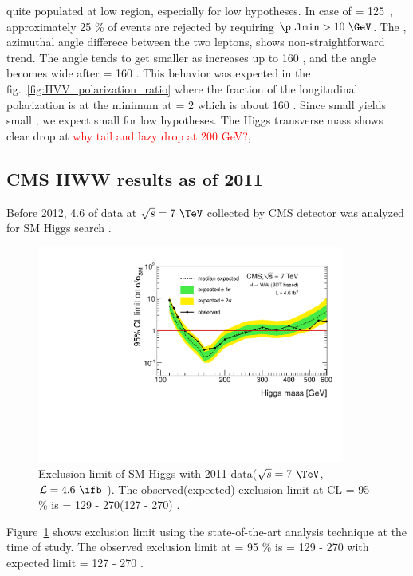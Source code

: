 quite populated at low \ptlmin{} region, especially for low \mHi{} 
hypotheses. In case of \mHi = 125~\GeV, approximately 25 \% of 
events are rejected by requiring $\ptlmin>10~\GeV$. 
The \delphill, azimuthal angle differece between the two leptons,  
shows non-straightforward trend. The angle tends to get smaller 
as \mHi{} increases up to 160 \GeV, and the angle becomes wide 
after \mHi = 160 \GeV. This behavior was expected in the 
fig.~\ref{fig:HVV_polarization_ratio} where the fraction of the 
longitudinal polarization is at the minimum at \mHi = 2\mW{} which is about 160 \GeV. 
Since small \delphill{} yields small \mll{}, we expect small \mll{} 
for low \mHi hypotheses. The Higgs transverse mass \mT{} shows clear 
drop at \mHi\textcolor{red}{why tail and lazy drop at 200 GeV?}, 

%
\subsection{CMS HWW results as of 2011}

Before 2012, 4.6 \ifb{} of data at $\sqrt{s}=7~\TeV$ collected by CMS detector 
was analyzed for SM Higgs search \cite{Chatrchyan201291}. 
\begin{figure}
\centering
\includegraphics[width=0.9\textwidth]{figures/limits_nj_shape.pdf}
\caption{ Exclusion limit of SM Higgs with 2011 data($\sqrt{s}=7~\TeV$, $\mathcal{L}=4.6~\ifb$ ).
The observed(expected) exclusion limit at CL  = 95 \% is \mHi = 129 - 270(127 - 270) \GeV.}
\label{fig:hww2011}
\end{figure}
Figure~\ref{fig:hww2011} shows exclusion limit using the state-of-the-art 
analysis technique at the time of study. 
The observed exclusion limit at \CLs  = 95 \% is \mHi = 129 - 270 \GeV 
with expected limit \mHi = 127 - 270 \GeV.

